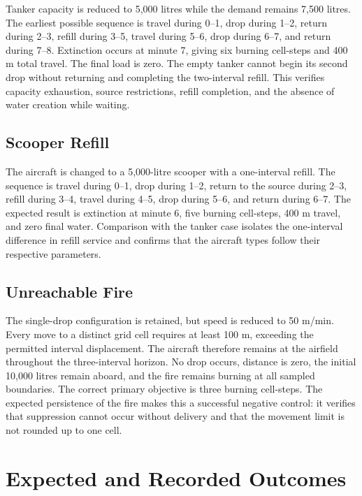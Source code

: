 Tanker capacity is reduced to 5,000 litres while the demand remains 7,500 litres. The earliest possible sequence is travel during 0--1, drop during 1--2, return during 2--3, refill during 3--5, travel during 5--6, drop during 6--7, and return during 7--8. Extinction occurs at minute 7, giving six burning cell-steps and 400 m total travel. The final load is zero. The empty tanker cannot begin its second drop without returning and completing the two-interval refill. This verifies capacity exhaustion, source restrictions, refill completion, and the absence of water creation while waiting.

\subsection{Scooper Refill}

The aircraft is changed to a 5,000-litre scooper with a one-interval refill. The sequence is travel during 0--1, drop during 1--2, return to the source during 2--3, refill during 3--4, travel during 4--5, drop during 5--6, and return during 6--7. The expected result is extinction at minute 6, five burning cell-steps, 400 m travel, and zero final water. Comparison with the tanker case isolates the one-interval difference in refill service and confirms that the aircraft types follow their respective parameters.

\subsection{Unreachable Fire}

The single-drop configuration is retained, but speed is reduced to 50 m/min. Every move to a distinct grid cell requires at least 100 m, exceeding the permitted interval displacement. The aircraft therefore remains at the airfield throughout the three-interval horizon. No drop occurs, distance is zero, the initial 10,000 litres remain aboard, and the fire remains burning at all sampled boundaries. The correct primary objective is three burning cell-steps. The expected persistence of the fire makes this a successful negative control: it verifies that suppression cannot occur without delivery and that the movement limit is not rounded up to one cell.

\section{Expected and Recorded Outcomes}
\label{sec:validation-outcomes}


